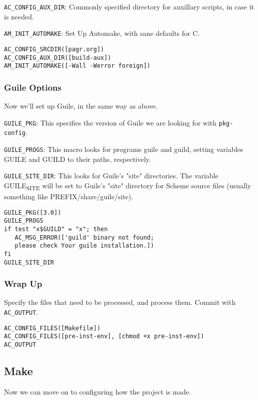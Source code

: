 \documentclass[11pt]{article}
\begin{document}
\texttt{AC\_CONFIG\_AUX\_DIR}: Commonly specified directory for auxillary scripts, in case
it is needed.

\texttt{AM\_INIT\_AUTOMAKE}: Set Up Automake, with sane defaults for C.

\begin{verbatim}
AC_CONFIG_SRCDIR([pagr.org])
AC_CONFIG_AUX_DIR([build-aux])
AM_INIT_AUTOMAKE([-Wall -Werror foreign])
\end{verbatim}

\subsubsection{Guile Options}
\label{sec:org3b248ea}
Now we'll set up Guile, in the same way as above.

\texttt{GUILE\_PKG}: This specifies the version of Guile we are looking for with
\texttt{pkg-config}.

\texttt{GUILE\_PROGS}: This macro looks for programs guile and guild, setting variables
GUILE and GUILD to their paths, respectively.

\texttt{GUILE\_SITE\_DIR}: This looks for Guile’s "site" directories. The variable
GUILE\textsubscript{SITE} will be set to Guile’s "site" directory for Scheme source files
(usually something like PREFIX/share/guile/site).

\begin{verbatim}
GUILE_PKG([3.0])
GUILE_PROGS
if test "x$GUILD" = "x"; then
   AC_MSG_ERROR(['guild' binary not found;
   please check Your guile installation.])
fi
GUILE_SITE_DIR
\end{verbatim}

\subsubsection{Wrap Up}
\label{sec:orgb7a4237}
Specify the files that need to be processed, and process them. Commit with
\texttt{AC\_OUTPUT}.

\begin{verbatim}
AC_CONFIG_FILES([Makefile])
AC_CONFIG_FILES([pre-inst-env], [chmod +x pre-inst-env])
AC_OUTPUT
\end{verbatim}

\subsection{Make}
\label{sec:org1c55d88}
Now we can move on to configuring how the project is made.
\end{document}
